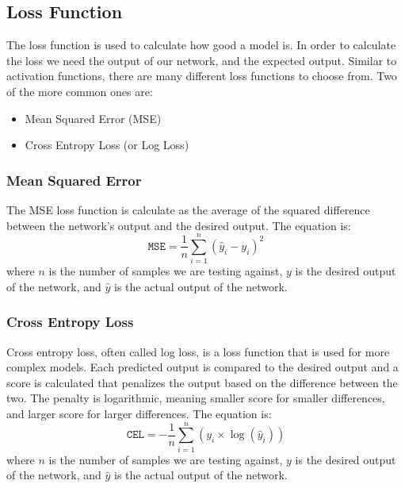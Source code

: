 \documentclass[titlepage]{article}
\begin{document}
\subsection{Loss Function}
The loss function is used to calculate how good a model is. In order to calculate the loss we need the output of our network, and the expected output\cite{Loss Functions}. Similar to activation functions, there are many different loss functions to choose from. Two of the more common ones are:
\begin{itemize}
    \item Mean Squared Error (MSE)
    \item Cross Entropy Loss (or Log Loss)
\end{itemize}

\subsubsection{Mean Squared Error}
The MSE loss function is calculate as the average of the squared difference between the network's output and the desired output. The equation is:
\begin{equation}
    \texttt{MSE} = \frac{1}{n} \sum_{i=1}^{n} (\hat{y}_i - y_i)^2
    \label{eq:MSE}
\end{equation}
where $n$ is the number of samples we are testing against, $y$ is the desired output of the network, and $\hat{y}$ is the actual output of the network.

\subsubsection{Cross Entropy Loss}
Cross entropy loss, often called log loss, is a loss function that is used for more complex models. Each predicted output is compared to the desired output and a score is calculated that penalizes the output based on the difference between the two. The penalty is logarithmic, meaning smaller score for smaller differences, and larger score for larger differences. The equation is:
\begin{equation}
    \texttt{CEL} = -\frac{1}{n}\sum_{i=1}^{n}(y_i\times\log(\hat{y}_i))
    \label{eq:CEL}
\end{equation}
where $n$ is the number of samples we are testing against, $y$ is the desired output of the network, and $\hat{y}$ is the actual output of the network.
\end{document}
